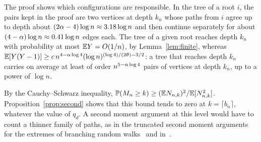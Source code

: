 \begin{remark}
The proof shows which configurations are responsible. In the tree of a root $i$, the pairs kept in the proof are
two vertices at depth $k_n$ whose paths from $i$ agree up to depth about $(2\alpha-4)\log n\approx3.18\log n$ and then
continue separately for about $(4-\alpha)\log n\approx0.41\log n$ edges each. The tree of a given root reaches depth
$k_n$ with probability at most $\mathbb{E} Y=O(1/n)$, by Lemma~\ref{lem:finite}, whereas
$\mathbb{E}[Y(Y-1)]\ge c\,n^{4-\alpha\log4}(\log n)^{(\log4)/(2\theta)-3/2}$: a tree that reaches depth $k_n$ carries on average
at least of order $n^{5-\alpha\log4}$ pairs of vertices at depth $k_n$, up to a power of $\log n$.
\end{remark}

\begin{remark}
By the Cauchy--Schwarz inequality, $\mathbb{P}(M_n\ge k)\ge(\mathbb{E} N_{n,k})^2/\mathbb{E}[N_{n,k}^2]$. Proposition~\ref{prop:second}
shows that this bound tends to zero at $k=\lceil b_n\rceil$, whatever the value of $q_d$. A second moment argument at
this level would have to count a thinner family of paths, as in the truncated second moment arguments for the extremes
of branching random walks~\cite{ABR,Aidekon} and in~\cite{ABL,ABF}.
\end{remark}
